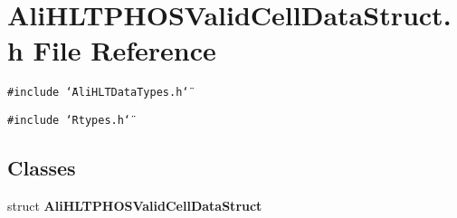 \section{Ali\-HLTPHOSValid\-Cell\-Data\-Struct.h File Reference}
\label{AliHLTPHOSValidCellDataStruct_8h}


{\tt \#include \char`\"{}Ali\-HLTData\-Types.h\char`\"{}}\par
{\tt \#include \char`\"{}Rtypes.h\char`\"{}}\par
\subsection*{Classes}
\begin{CompactItemize}
\item 
struct {\bf Ali\-HLTPHOSValid\-Cell\-Data\-Struct}
\end{CompactItemize}
